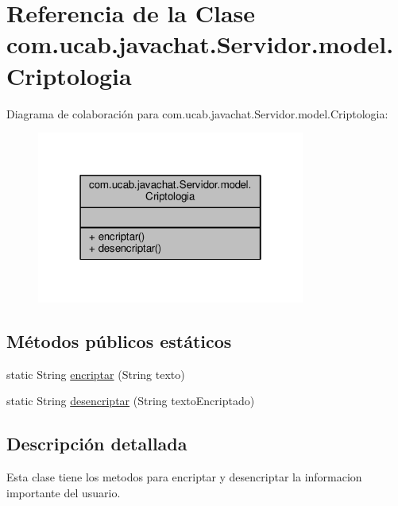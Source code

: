 \hypertarget{classcom_1_1ucab_1_1javachat_1_1_servidor_1_1model_1_1_criptologia}{\section{Referencia de la Clase com.\-ucab.\-javachat.\-Servidor.\-model.\-Criptologia}
\label{classcom_1_1ucab_1_1javachat_1_1_servidor_1_1model_1_1_criptologia}
}


Diagrama de colaboración para com.\-ucab.\-javachat.\-Servidor.\-model.\-Criptologia\-:\nopagebreak
\begin{figure}[H]
\begin{center}
\leavevmode
\includegraphics[width=250pt]{classcom_1_1ucab_1_1javachat_1_1_servidor_1_1model_1_1_criptologia__coll__graph}
\end{center}
\end{figure}
\subsection*{Métodos públicos estáticos}
\begin{DoxyCompactItemize}
\item 
static String \hyperlink{classcom_1_1ucab_1_1javachat_1_1_servidor_1_1model_1_1_criptologia_a0a816425dbef403c92d0f858e6a910cd}{encriptar} (String texto)
\item 
static String \hyperlink{classcom_1_1ucab_1_1javachat_1_1_servidor_1_1model_1_1_criptologia_ae580b0995ce546a2e8b37c819651d240}{desencriptar} (String texto\-Encriptado)
\end{DoxyCompactItemize}


\subsection{Descripción detallada}
Esta clase tiene los metodos para encriptar y desencriptar la informacion importante del usuario.


